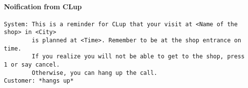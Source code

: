 \documentclass[../../main.tex]{subfiles}
\begin{document}
\paragraph{Noification from CLup}

\begin{verbatim}
System: This is a reminder for CLup that your visit at <Name of the shop> in <City>
        is planned at <Time>. Remember to be at the shop entrance on time.
        If you realize you will not be able to get to the shop, press 1 or say cancel.
        Otherwise, you can hang up the call.
Customer: *hangs up*
\end{verbatim}
\end{document}
